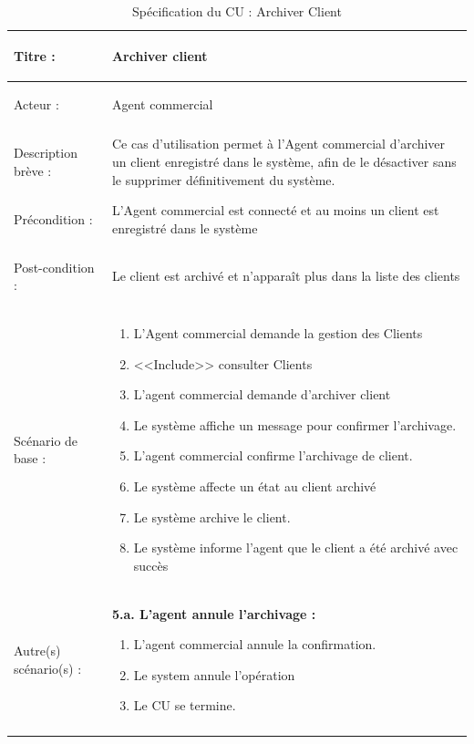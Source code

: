 \begin{longtable}{|>{\bfseries\raggedright\arraybackslash}p{3.5cm}|p{\dimexpr\textwidth-3.5cm-4\tabcolsep-2\arrayrulewidth}|}
\hline
Titre : & Archiver client \\
\hline
Acteur : & Agent commercial \\
\hline
Description brève : & Ce cas d'utilisation permet à l'Agent commercial d'archiver un client enregistré dans le système, afin de le désactiver sans le supprimer définitivement du système. \\
\hline
Précondition : & L'Agent commercial est connecté et au moins un client est enregistré dans le système \\
\hline
Post-condition : & Le client est archivé et n'apparaît plus dans la liste des clients \\
\hline
Scénario de base : &
\begin{enumerate}[leftmargin=1.5em, topsep=2pt, itemsep=1pt]
  \item L'Agent commercial demande la gestion des Clients
  \item <<Include>> consulter Clients
  \item L'agent commercial demande d'archiver client
  \item Le système affiche un message pour confirmer l'archivage.
  \item L'agent commercial confirme l'archivage de client.
  \item Le système affecte un état au client archivé
  \item Le système archive le client.
  \item Le système informe l'agent que le client a été archivé avec succès
 
\end{enumerate} \\
\hline
Autre(s) scénario(s) : &
\textbf{5.a. L'agent annule l'archivage :}
\begin{enumerate}[leftmargin=1.5em, topsep=2pt, itemsep=1pt]
  \item L'agent commercial annule la confirmation.
  \item Le system annule l'opération
  \item Le CU se termine.
\end{enumerate} \\
\hline
\caption{Spécification du CU : Archiver Client}
\label{tab:cu-archiver-client}
\end{longtable}

\newpage
{}
